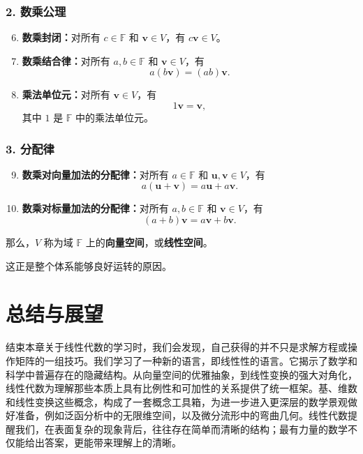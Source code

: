 \subsubsection*{2. 数乘公理}
\begin{enumerate}
    \setcounter{enumi}{5}
    \item \textbf{数乘封闭：}对所有 $c\in\mathbb{F}$ 和 $\mathbf{v}\in V$，有 $c\mathbf{v}\in V$。
    \item \textbf{数乘结合律：}对所有 $a,b\in\mathbb{F}$ 和 $\mathbf{v}\in V$，有
    \[
    a(b\mathbf{v})=(ab)\mathbf{v}.
    \]
    \item \textbf{乘法单位元：}对所有 $\mathbf{v}\in V$，有
    \[
    1\mathbf{v}=\mathbf{v},
    \]
    其中 $1$ 是 $\mathbb{F}$ 中的乘法单位元。
\end{enumerate}

\subsubsection*{3. 分配律}
\begin{enumerate}
    \setcounter{enumi}{8}
    \item \textbf{数乘对向量加法的分配律：}对所有 $a\in\mathbb{F}$ 和 $\mathbf{u},\mathbf{v}\in V$，有
    \[
    a(\mathbf{u}+\mathbf{v})=a\mathbf{u}+a\mathbf{v}.
    \]
    \item \textbf{数乘对标量加法的分配律：}对所有 $a,b\in\mathbb{F}$ 和 $\mathbf{v}\in V$，有
    \[
    (a+b)\mathbf{v}=a\mathbf{v}+b\mathbf{v}.
    \]
\end{enumerate}

那么，$V$ 称为域 $\mathbb{F}$ 上的\textbf{向量空间}，或\textbf{线性空间}。

这正是整个体系能够良好运转的原因。

\section{总结与展望}

结束本章关于线性代数的学习时，我们会发现，自己获得的并不只是求解方程或操作矩阵的一组技巧。我们学习了一种新的语言，即线性性的语言。它揭示了数学和科学中普遍存在的隐藏结构。从向量空间的优雅抽象，到线性变换的强大对角化，线性代数为理解那些本质上具有比例性和可加性的关系提供了统一框架。基、维数和线性变换这些概念，构成了一套概念工具箱，为进一步进入更深层的数学景观做好准备，例如泛函分析中的无限维空间，以及微分流形中的弯曲几何。线性代数提醒我们，在表面复杂的现象背后，往往存在简单而清晰的结构；最有力量的数学不仅能给出答案，更能带来理解上的清晰。

